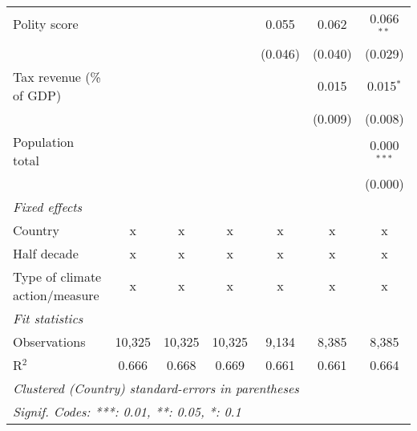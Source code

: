 \begin{tabular}{lcccccc}
   Polity score                                                          &         &                &                & 0.055          & 0.062          & 0.066$^{**}$\\   
                                                                         &         &                &                & (0.046)        & (0.040)        & (0.029)\\   
   Tax revenue (\% of GDP)                                               &         &                &                &                & 0.015          & 0.015$^{*}$\\   
                                                                         &         &                &                &                & (0.009)        & (0.008)\\   
   Population total                                                      &         &                &                &                &                & 0.000$^{***}$\\   
                                                                         &         &                &                &                &                & (0.000)\\   
   \emph{Fixed effects}\\
   Country                                                               & x       & x              & x              & x              & x              & x\\  
   Half decade                                                           & x       & x              & x              & x              & x              & x\\  
   Type of climate action/measure                                        & x       & x              & x              & x              & x              & x\\  
   \midrule \emph{Fit statistics}\\
   Observations                                                          & 10,325  & 10,325         & 10,325         & 9,134          & 8,385          & 8,385\\  
   R$^2$                                                                 & 0.666   & 0.668          & 0.669          & 0.661          & 0.661          & 0.664\\  
   \midrule
   \multicolumn{7}{l}{\emph{Clustered (Country) standard-errors in parentheses}}\\
   \multicolumn{7}{l}{\emph{Signif. Codes: ***: 0.01, **: 0.05, *: 0.1}}\\
\end{tabular}
\par\endgroup


